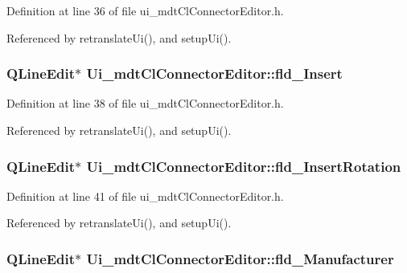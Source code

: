 Definition at line 36 of file ui\-\_\-mdt\-Cl\-Connector\-Editor.\-h.



Referenced by retranslate\-Ui(), and setup\-Ui().

\hypertarget{class_ui__mdt_cl_connector_editor_a07a5618dd8e252b5ed533b38f3c5a4ad}{
\subsubsection[{fld\-\_\-\-Insert}]{\setlength{\rightskip}{0pt plus 5cm}Q\-Line\-Edit$\ast$ Ui\-\_\-mdt\-Cl\-Connector\-Editor\-::fld\-\_\-\-Insert}}\label{class_ui__mdt_cl_connector_editor_a07a5618dd8e252b5ed533b38f3c5a4ad}


Definition at line 38 of file ui\-\_\-mdt\-Cl\-Connector\-Editor.\-h.



Referenced by retranslate\-Ui(), and setup\-Ui().

\hypertarget{class_ui__mdt_cl_connector_editor_a601c7c4045a1dce3cb21b47ed41ee56e}{
\subsubsection[{fld\-\_\-\-Insert\-Rotation}]{\setlength{\rightskip}{0pt plus 5cm}Q\-Line\-Edit$\ast$ Ui\-\_\-mdt\-Cl\-Connector\-Editor\-::fld\-\_\-\-Insert\-Rotation}}\label{class_ui__mdt_cl_connector_editor_a601c7c4045a1dce3cb21b47ed41ee56e}


Definition at line 41 of file ui\-\_\-mdt\-Cl\-Connector\-Editor.\-h.



Referenced by retranslate\-Ui(), and setup\-Ui().

\hypertarget{class_ui__mdt_cl_connector_editor_a43426cbc31767a4b137a91a3f2ad4c2b}{
\subsubsection[{fld\-\_\-\-Manufacturer}]{\setlength{\rightskip}{0pt plus 5cm}Q\-Line\-Edit$\ast$ Ui\-\_\-mdt\-Cl\-Connector\-Editor\-::fld\-\_\-\-Manufacturer}}\label{class_ui__mdt_cl_connector_editor_a43426cbc31767a4b137a91a3f2ad4c2b}


